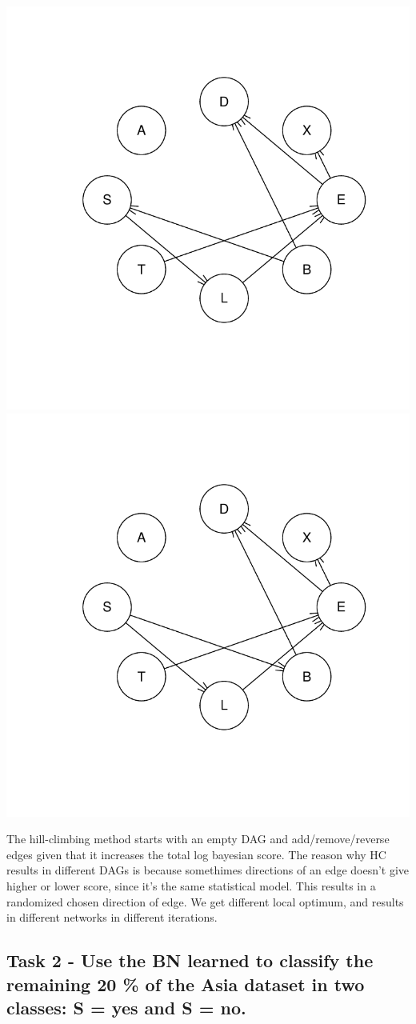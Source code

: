 \documentclass[]{article}
\begin{document}
\begin{center}\includegraphics[width=.49\linewidth]{Lab1_graphical_models_alive213_files/figure-latex/unnamed-chunk-3-1} \includegraphics[width=.49\linewidth]{Lab1_graphical_models_alive213_files/figure-latex/unnamed-chunk-3-2} \end{center}

The hill-climbing method starts with an empty DAG and add/remove/reverse
edges given that it increases the total log bayesian score. The reason
why HC results in different DAGs is because somethimes directions of an
edge doesn't give higher or lower score, since it's the same statistical
model. This results in a randomized chosen direction of edge. We get
different local optimum, and results in different networks in different
iterations.

\hypertarget{task-2---use-the-bn-learned-to-classify-the-remaining-20-of-the-asia-dataset-in-two-classes-s-yes-and-s-no.}{%
\subsection{Task 2 - Use the BN learned to classify the remaining 20 \%
of the Asia dataset in two classes: S = yes and S =
no.}\label{task-2---use-the-bn-learned-to-classify-the-remaining-20-of-the-asia-dataset-in-two-classes-s-yes-and-s-no.}}
\end{document}
